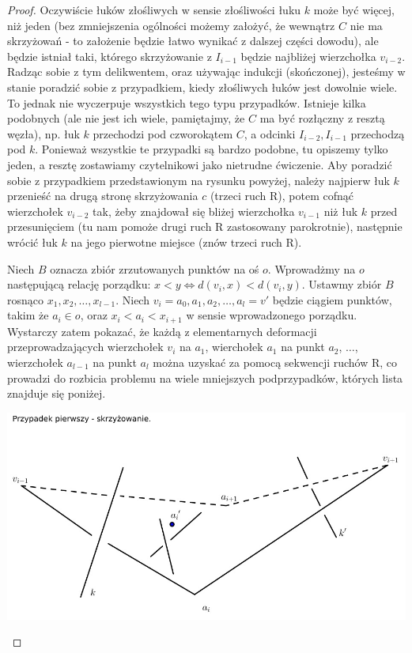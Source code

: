 \begin{proof}
Oczywiście łuków złośliwych w sensie złośliwości łuku $k$ może być więcej, niż jeden (bez zmniejszenia ogólności możemy założyć, że wewnątrz $C$ nie ma skrzyżowań - 
to założenie będzie łatwo wynikać z dalszej części dowodu), ale będzie istniał taki, którego skrzyżowanie z $I_{i-1}$ będzie najbliżej wierzchołka $v_{i-2}$.
Radząc sobie z tym delikwentem, oraz używając indukcji (skończonej), jesteśmy w stanie poradzić sobie z przypadkiem, kiedy złośliwych łuków jest dowolnie wiele. To jednak nie wyczerpuje
wszystkich tego typu przypadków. Istnieje kilka podobnych (ale nie jest ich wiele, pamiętajmy, że $C$ ma być rozłączny z resztą węzła), np. łuk $k$ przechodzi pod czworokątem $C$, a odcinki $I_{i-2}, I_{i-1}$ przechodzą pod $k$. 
Ponieważ wszystkie te przypadki są bardzo podobne, tu opiszemy tylko jeden, a resztę zostawiamy czytelnikowi jako nietrudne ćwiczenie.
Aby poradzić sobie z przypadkiem przedstawionym na rysunku powyżej, należy najpierw łuk $k$ przenieść na drugą stronę skrzyżowania $c$ (trzeci ruch R), potem cofnąć wierzchołek $v_{i-2}$
tak, żeby znajdował się bliżej wierzchołka $v_{i-1}$ niż łuk $k$ przed przesunięciem (tu nam pomoże drugi ruch R zastosowany parokrotnie), 
następnie wrócić łuk $k$ na jego pierwotne miejsce (znów trzeci ruch R).
 

Niech $B$ oznacza zbiór zrzutowanych punktów na oś $o$. Wprowadżmy na $o$ następującą relację porządku: $x < y\iff d(v_i,x) < d(v_i, y)$. Ustawmy zbiór $B$ rosnąco $x_1, x_2, \ldots, x_{l-1}$.
Niech $v_i = a_0, a_1, a_2, \ldots, a_l = v'$ będzie ciągiem punktów, takim że $a_i\in o$, oraz $x_i < a_i < x_{i+1}$ w sensie wprowadzonego porządku. 
Wystarczy zatem pokazać, że każdą z elementarnych deformacji przeprowadzających wierzchołek $v_i$ na $a_1$, wierchołek $a_1$ na punkt $a_2$, $\ldots$, 
wierzchołek $a_{l-1}$ na punkt $a_l$ można uzyskać za pomocą sekwencji ruchów R, co prowadzi do rozbicia problemu na wiele mniejszych podprzypadków, których lista znajduje się
poniżej.


	\begin{center}

	\includegraphics[scale=0.6]{1/pictures/cross.jpg}
	\end{center}


\end{proof}
